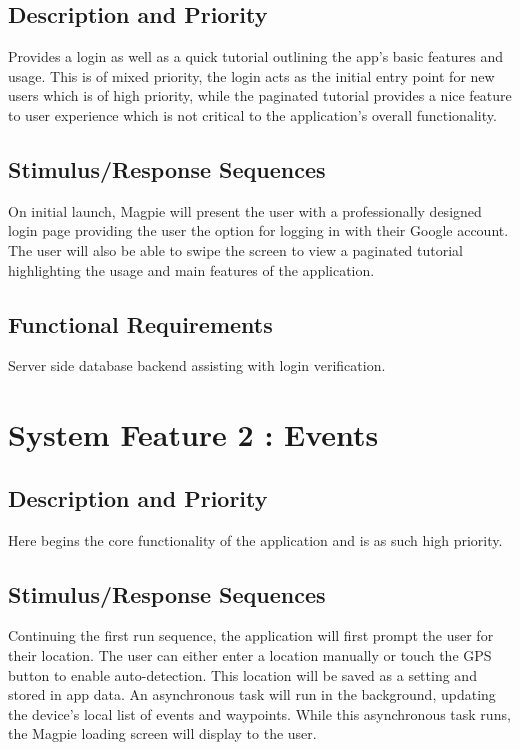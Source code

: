 \documentclass{scrreprt}
\begin{document}
\subsection{Description and Priority}
Provides a login as well as a quick tutorial outlining the app's  basic features and
usage. This is of mixed priority, the login acts as the initial entry point for new users
which is of high priority, while the paginated tutorial provides a nice feature to user
experience which is not critical to the application's overall functionality.

\subsection{Stimulus/Response Sequences}
On initial launch, Magpie will present the user with a professionally designed login
page providing the user the option for logging in with their Google account. The user
will also be able to swipe the screen to view a paginated tutorial highlighting the
usage and main features of the application.

\subsection{Functional Requirements}
Server side database backend assisting with login verification.

\section{System Feature 2 : Events}

\subsection{Description and Priority}
Here begins the core functionality of the application and is as such high priority.

\subsection{Stimulus/Response Sequences}
Continuing the first run sequence, the application will first prompt the user for their location.
The user can either enter a location manually or touch the GPS button to enable auto-detection.
This location will be saved as a setting and stored in app data.
An asynchronous task will run in the background, updating the device's local list of events and waypoints.
While this asynchronous task runs, the Magpie loading screen will display to the user.
\end{document}

